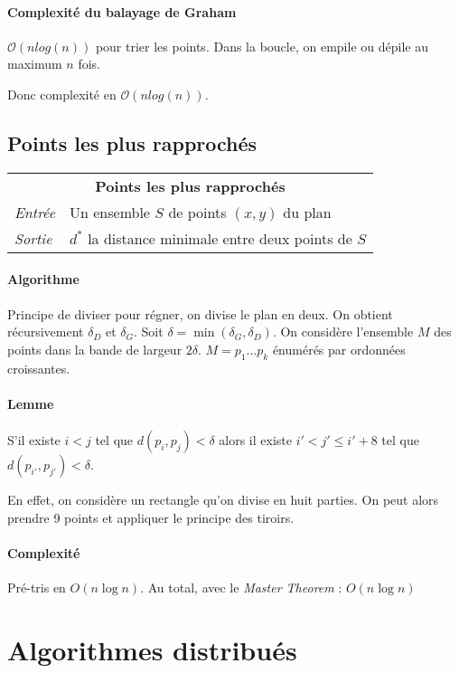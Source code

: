 \documentclass[french]{article}
\begin{document}
\paragraph{Complexité du balayage de Graham}
$\mathcal{O}(n log(n))$ pour trier les points. Dans la boucle, on empile ou dépile au maximum $n$ fois.

Donc complexité en $\mathcal{O}(n log(n))$.

\subsection{Points les plus rapprochés}

\vspace{0.5cm}
\begin{tabularx}{\textwidth}{p{1cm}X}
\multicolumn{2}{c}{\textbf{Points les plus rapprochés}} \\ 
\emph{Entrée} & Un ensemble $S$ de points $(x,y)$ du plan \\ 
\emph{Sortie} & $d^*$ la distance minimale entre deux points de $S$ \\
\end{tabularx}

\paragraph{Algorithme}Principe de diviser pour régner, on divise le plan en deux. On obtient récursivement $\delta_D$ et $\delta_G$. Soit $\delta = \min (\delta_G, \delta_D)$. On considère l'ensemble $M$ des points dans la bande de largeur $2\delta$. $M = p_1 \ldots p_k$ énumérés par ordonnées croissantes.

\paragraph{Lemme}S'il existe $i < j$ tel que $d(p_i,p_j) < \delta$ alors il existe $i' < j' \leq i'+8$ tel que $d(p_{i'},p_{j'}) < \delta$.

En effet, on considère un rectangle qu'on divise en huit parties. On peut alors prendre 9 points et appliquer le principe des tiroirs.

\paragraph{Complexité} Pré-tris en $O(n \log n)$. Au total, avec le \emph{Master Theorem} : $O(n \log n)$

\section{Algorithmes distribués}
\end{document}

